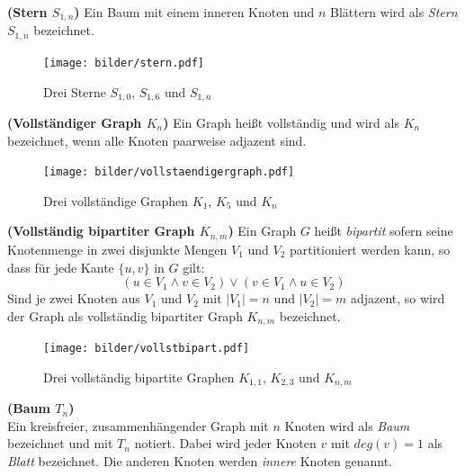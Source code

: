 \vspace{-4mm}
\begin{defi}{\textbf{(Stern $S_{1,n}$)}}\newline
Ein Baum mit einem inneren Knoten und $n$ Blättern wird als \emph{Stern} $S_{1,n}$ bezeichnet. 
\label{defstern}\end{defi}
\vspace{-5mm}
\begin{figure}[h!]
		\centering 		 
   \texttt{[image: bilder/stern.pdf]}
	\caption{Drei Sterne $S_{1,0}$, $S_{1,6}$ und $S_{1,n}$}
  	 \end{figure}
\newpage
\vspace{-4mm}
\begin{defi}{\textbf{(Vollständiger Graph $K_n$)}}\newline
Ein Graph heißt vollständig und wird als $K_n$ bezeichnet, wenn alle Knoten paarweise adjazent sind.
\end{defi}
\vspace{-8mm}
\begin{figure}[h!]
		\centering 		 
   \texttt{[image: bilder/vollstaendigergraph.pdf]}
	\caption{Drei vollständige Graphen $K_1$, $K_5$ und $K_n$}
  	 \end{figure}
  	 \vspace{-4mm}
\begin{defi}{\textbf{(Vollständig bipartiter Graph $K_{n,m}$)}}\newline
Ein Graph $G$ heißt \emph{bipartit} sofern seine Knotenmenge in zwei disjunkte Mengen $V_1$ und $V_2$ partitioniert werden kann, so dass für jede Kante $\{u,v\}$ in $G$ gilt: $$(u \in V_1 \wedge v \in V_2)\vee (v \in V_1 \wedge u \in V_2)$$Sind je zwei Knoten aus $V_1$ und $V_2$ mit $|V_1|=n$ und $|V_2|=m$ adjazent, so wird der Graph als vollständig bipartiter Graph $K_{n,m}$ bezeichnet. \end{defi}
  	 \vspace{-6mm}
\begin{figure}[h!]
		\centering 		 
   \texttt{[image: bilder/vollstbipart.pdf]}
	\caption{Drei vollständig bipartite Graphen $K_{1,1}$, $K_{2,3}$ und $K_{n,m}$}
  	 \end{figure}
\begin{defi}{\textbf{(Baum $T_n$)}}\\
Ein kreisfreier, zusammenhängender Graph mit $n$ Knoten wird als \emph{Baum} bezeichnet und mit $T_n$ notiert. Dabei wird jeder Knoten $v$ mit $deg(v)=1$ als \emph{Blatt} bezeichnet. Die anderen Knoten werden \emph{innere} Knoten genannt. \end{defi}
